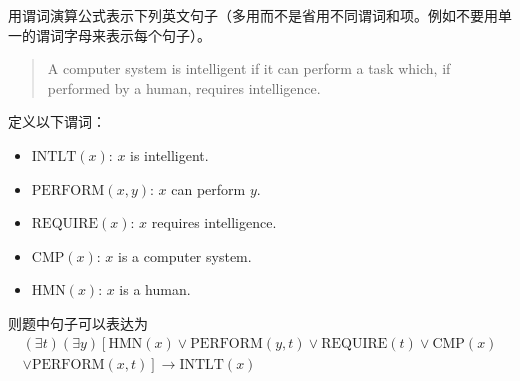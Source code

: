 \begin{question}
用谓词演算公式表示下列英文句子（多用而不是省用不同谓词和项。例如不要用单一的谓词字母来表示每个句子）。
	\begin{quote}
		A computer system is intelligent if it can perform a task which, if performed by a human, requires intelligence. 
	\end{quote}
\end{question}
\begin{solution}
定义以下谓词：
	\begin{itemize}
		\item $\mathrm{INTLT}(x)$:	$x$ is intelligent.
		\item $\mathrm{PERFORM}(x,y)$:	$x$ can perform $y$.
		\item $\mathrm{REQUIRE}(x)$:		$x$ requires intelligence.
		\item $\mathrm{CMP}(x)$:		$x$ is a computer system.
		\item $\mathrm{HMN}(x)$:		$x$ is a human.
	\end{itemize} \par
则题中句子可以表达为
	\begin{multline*}
	\left( \exists t \right) \left( \exists y \right)
	\left[ \mathrm{HMN}(x) \vee \mathrm{PERFORM}(y,t) \vee \mathrm{REQUIRE}(t)
	\vee \mathrm{CMP}(x) \right. \\
	\left. \vee \mathrm{PERFORM}(x,t) \right] 
	\to \mathrm{INTLT}(x)
	\end{multline*}
\end{solution}

